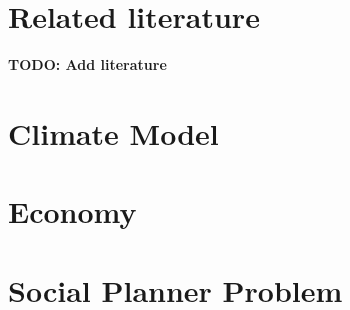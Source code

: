 \documentclass[american, abstract=off]{scrartcl}
\begin{document}
\section{Related literature}
\textbf{TODO: Add literature}

\section{Climate Model}



\section{Economy}



\section{Social Planner Problem}



\nocite{*}
\newpage
\printbibliography
\end{document}
